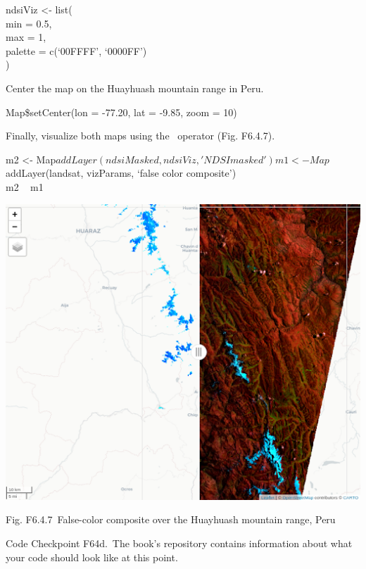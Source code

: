 \documentclass[
  letterpaper,
  DIV=11,
  numbers=noendperiod]{scrreprt}
\begin{document}
ndsiViz \textless- list(\\
\hspace*{0.333em}min = 0.5,\\
\hspace*{0.333em}max = 1,\\
\hspace*{0.333em}palette = c(`00FFFF', `0000FF')\\
)

Center the map on the Huayhuash mountain range in Peru.

Map\$setCenter(lon = -77.20, lat = -9.85, zoom = 10)

Finally, visualize both maps using the \textbar~operator (Fig. F6.4.7).

m2 \textless-
Map\(addLayer(ndsiMasked, ndsiViz, 'NDSI masked') m1 <- Map\)addLayer(landsat,
vizParams, `false color composite')\\
m2 ~\textbar{} m1

\includegraphics{./F6/image35.png}

Fig. F6.4.7~False-color composite over the Huayhuash mountain range,
Peru

\begin{tcolorbox}[enhanced jigsaw, left=2mm, breakable, rightrule=.15mm, opacityback=0, colframe=quarto-callout-note-color-frame, colbacktitle=quarto-callout-note-color!10!white, arc=.35mm, opacitybacktitle=0.6, toptitle=1mm, colback=white, leftrule=.75mm, title=\textcolor{quarto-callout-note-color}{\faInfo}\hspace{0.5em}{Note}, toprule=.15mm, bottomtitle=1mm, titlerule=0mm, bottomrule=.15mm, coltitle=black]

Code Checkpoint F64d.~The book's repository contains information about
what your code should look like at this point.

\end{tcolorbox}
\end{document}
